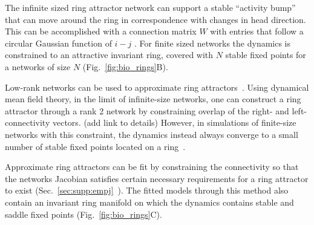 \documentclass{article} %
\newcommand{\mpcomment}[1]{\textcolor{mpcolor}{(#1)}}
\newcounter{ct}
\theoremstyle{definition}
\theoremstyle{remark}
\begin{document}

The infinite sized ring attractor network can support a stable ``activity bump'' that can move around the ring in correspondence with changes in head direction.
This can be accomplished with a connection matrix $W$ with entries that follow a circular Gaussian function of $i-j$ \citep{seeholzer2017efficient,redish1996coupled,goodridge2000,compte2000synaptic}.
For finite sized networks the dynamics is constrained to an attractive invariant ring, covered with $N$ stable fixed points for a networks of size $N$ (Fig.~\ref{fig:bio_rings}B).
%

Low-rank networks can be used to approximate ring attractors~\citep{mastrogiuseppe2018, beiran2021}.
Using dynamical mean field theory, in the limit of infinite-size networks, one can construct a ring attractor through a rank 2 network by constraining overlap of the right- and left-connectivity vectors. \mpcomment{add link to details}
However, in simulations of finite-size networks with this constraint, the dynamics instead always converge to a small number of stable fixed points located on a ring~\citep{mastrogiuseppe2018}.

Approximate ring attractors can be fit by constraining the connectivity so that the networks Jacobian satisfies certain necessary requirements for a ring attractor to exist (Sec.~\ref{sec:supp:empj}~\citep{pollock2020}).
The fitted models through this method also contain an invariant ring manifold on which the dynamics contains stable and saddle fixed points (Fig.~\ref{fig:bio_rings}C).
\end{document}
